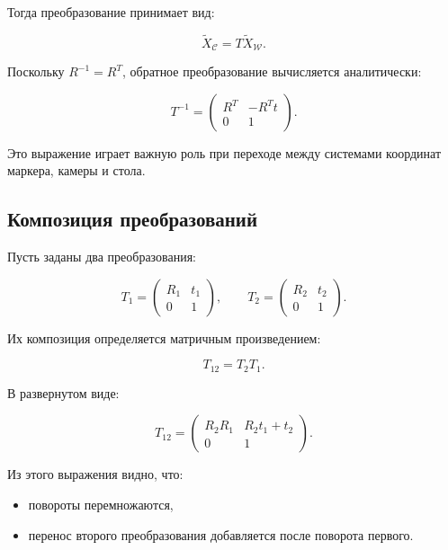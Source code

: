 \documentclass[a4paper,12pt]{article}
\begin{document}
Тогда преобразование принимает вид:

\begin{equation}
\tilde{X}_{\mathcal{C}} = T \tilde{X}_{\mathcal{W}}.
\end{equation}

Поскольку $R^{-1} = R^T$, обратное преобразование вычисляется аналитически:

\begin{equation}
T^{-1} =
\begin{pmatrix}
R^T & -R^T t \\
0 & 1
\end{pmatrix}.
\end{equation}

Это выражение играет важную роль при переходе между системами координат маркера, камеры и стола.

\subsection*{Композиция преобразований}

Пусть заданы два преобразования:

\begin{equation}
T_{1} =
\begin{pmatrix}
R_1 & t_1 \\
0 & 1
\end{pmatrix},
\qquad
T_{2} =
\begin{pmatrix}
R_2 & t_2 \\
0 & 1
\end{pmatrix}.
\end{equation}

Их композиция определяется матричным произведением:

\begin{equation}
T_{12} = T_2 T_1.
\end{equation}

В развернутом виде:

\begin{equation}
T_{12} =
\begin{pmatrix}
R_2 R_1 & R_2 t_1 + t_2 \\
0 & 1
\end{pmatrix}.
\end{equation}

Из этого выражения видно, что:

\begin{itemize}
    \item повороты перемножаются,
    \item перенос второго преобразования добавляется после поворота первого.
\end{itemize}
\end{document}
